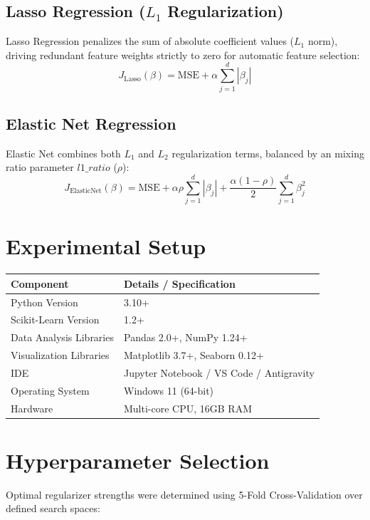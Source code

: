 \documentclass[12pt,a4paper]{article}
\begin{document}
\subsection{Lasso Regression ($L_1$ Regularization)}
Lasso Regression penalizes the sum of absolute coefficient values ($L_1$ norm), driving redundant feature weights strictly to zero for automatic feature selection:
\begin{equation}
    J_{\text{Lasso}}(\beta) = \text{MSE} + \alpha \sum_{j=1}^{d} |\beta_j|
\end{equation}

\subsection{Elastic Net Regression}
Elastic Net combines both $L_1$ and $L_2$ regularization terms, balanced by an mixing ratio parameter $l1\_ratio$ ($\rho$):
\begin{equation}
    J_{\text{ElasticNet}}(\beta) = \text{MSE} + \alpha \rho \sum_{j=1}^{d} |\beta_j| + \frac{\alpha (1 - \rho)}{2} \sum_{j=1}^{d} \beta_j^2
\end{equation}

\section{Experimental Setup}
\begin{table}[!htbp]
\centering
\begin{tabular}{ll}
\toprule
Component & Details / Specification \\
\midrule
Python Version & 3.10+ \\
Scikit-Learn Version & 1.2+ \\
Data Analysis Libraries & Pandas 2.0+, NumPy 1.24+ \\
Visualization Libraries & Matplotlib 3.7+, Seaborn 0.12+ \\
IDE & Jupyter Notebook / VS Code / Antigravity \\
Operating System & Windows 11 (64-bit) \\
Hardware & Multi-core CPU, 16GB RAM \\
\bottomrule
\end{tabular}
\end{table}

\section{Hyperparameter Selection}
Optimal regularizer strengths were determined using 5-Fold Cross-Validation over defined search spaces:
\end{document}
